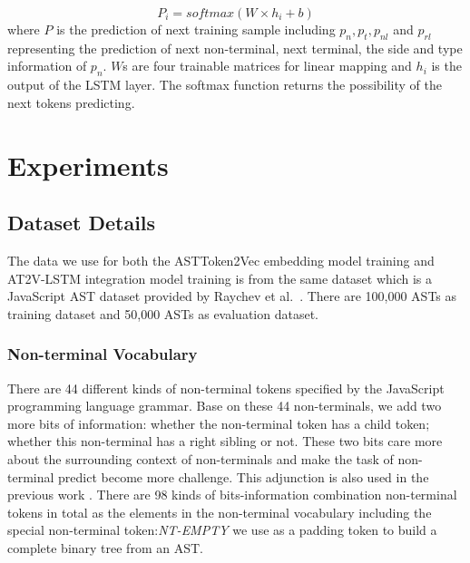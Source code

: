 \documentclass[E]{compsoft}
\begin{document}
\begin{equation}
P_{i} = \mathit{softmax}(W \times h_{i} + b)
\end{equation}
where $P$ is the prediction of next training sample including $p_{n}, p_{t}, p_{nl}$ and $p_{rl}$ representing the prediction of next non-terminal, next terminal, the side and type information of $p_{n}$. 
$W$s are four trainable matrices for linear mapping and $h_{i}$ is the output of the LSTM layer.
The softmax function returns the possibility of the next tokens predicting.
 




\section{Experiments}
\label{section:experiment}
\subsection{Dataset Details}
The data we use for both the ASTToken2Vec embedding model training and AT2V-LSTM integration model training is from the same dataset which is a JavaScript AST dataset provided by Raychev et al.\  \cite{dataset}. 
There are 100,000 ASTs as training dataset and 50,000 ASTs as evaluation dataset. 

\subsubsection{Non-terminal Vocabulary} 
There are 44 different kinds of non-terminal tokens specified by the JavaScript programming language grammar. 
Base on these 44 non-terminals, we add two more bits of information: whether the non-terminal token has a child token; whether this non-terminal has a right sibling or not. 
These two bits care more about the surrounding context of non-terminals and make the task of non-terminal predict become more challenge. 
This adjunction is also used in the previous work \cite{liu2016neural}\cite{dataset}. 
There are 98 kinds of bits-information combination non-terminal tokens in total as the elements in the non-terminal vocabulary including the special non-terminal token:\textit{NT-EMPTY} we use as a padding token to build a complete binary tree from an AST.
\end{document}
